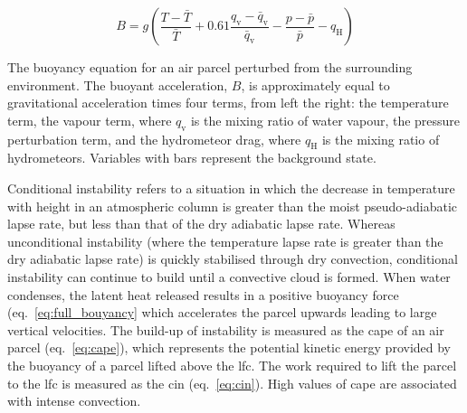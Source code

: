 \begin{eqfloat}
    \begin{equation}
    \label{eq:full_bouyancy}
        B = g \left ( \frac{T - \bar{T}}{\bar{T}} + 0.61 \frac{q_\mathrm{v} - \bar{q}_\mathrm{v}}{\bar{q}_\mathrm{v}} - \frac{p - \bar{p}}{\bar{p}} - q_\mathrm{H} \right )
    \end{equation}
    \caption{The buoyancy equation for an air parcel perturbed from the surrounding environment. The buoyant acceleration, $B$, is approximately equal to gravitational acceleration times four terms, from left the right: the temperature term, the vapour term, where $q_\mathrm{v}$ is the mixing ratio of water vapour, the pressure perturbation term, and the hydrometeor drag, where $q_\mathrm{H}$ is the mixing ratio of hydrometeors. Variables with bars represent the background state.}
\end{eqfloat}

Conditional instability refers to a situation in which the decrease in temperature with height in an atmospheric column is greater than the moist pseudo-adiabatic lapse rate, but less than that of the dry adiabatic lapse rate. 
Whereas unconditional instability (where the temperature lapse rate is greater than the dry adiabatic lapse rate) is quickly stabilised through dry convection, conditional instability can continue to build until a convective cloud is formed. 
When water condenses, the latent heat released results in a positive buoyancy force (eq.~\ref{eq:full_bouyancy} which accelerates the parcel upwards leading to large vertical velocities.
The build-up of instability is measured as the \acrfull{cape} of an air parcel (eq.~\ref{eq:cape}), which represents the potential kinetic energy provided by the buoyancy of a parcel lifted above the \acrshort{lfc}. The work required to lift the parcel to the \acrshort{lfc} is measured as the \acrfull{cin} (eq.~\ref{eq:cin}). High values of \acrshort{cape} are associated with intense convection.


